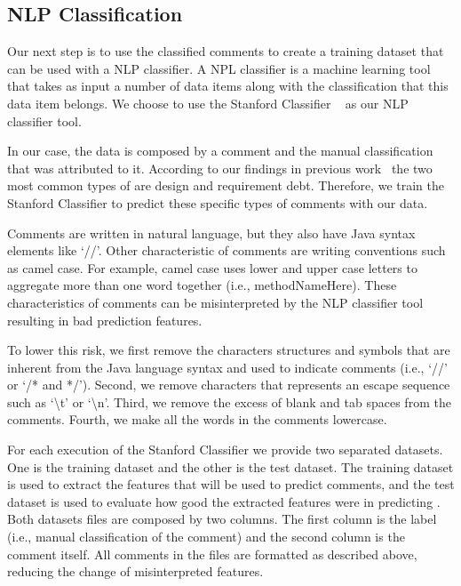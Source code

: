 
\subsection{NLP Classification} %
\label{sub:run_the_nlp_classifier}


Our next step is to use the classified \SATD comments to create a training dataset that can be used with a NLP classifier. A NPL classifier is a machine learning tool that takes as input a number of data items along with the classification that this data item belongs. We choose to use the Stanford Classifier ~\cite{Manning2014ACL} as our NLP classifier tool. 

In our case, the data is composed by a comment and the manual classification that was attributed to it. According to our findings in previous work~\cite{Maldonado2015MTD} the two most common types of \SATD are design and requirement debt. Therefore, we train the Stanford Classifier to predict these specific types of \SATD comments with our data.

Comments are written in natural language, but they also have Java syntax elements like `//'. Other characteristic of comments are writing conventions such as camel case. For example, camel case uses lower and upper case letters to aggregate more than one word together (i.e., methodNameHere). These characteristics of comments can be misinterpreted by the NLP classifier tool resulting in bad prediction features. 

To lower this risk, we first remove the characters structures and symbols that are inherent from the Java language syntax and used to indicate comments (i.e., `//' or `/* and */'). Second, we remove characters that represents an escape sequence such as `\textbackslash t' or `\textbackslash n'. Third, we remove the excess of blank and tab spaces from the comments. Fourth, we make all the words in the comments lowercase.

For each execution of the Stanford Classifier we provide two separated datasets. One is the training dataset and the other is the test dataset. The training dataset is used to extract the features that will be used to predict \SATD comments, and the test dataset is used to evaluate how good the extracted features were in predicting \SATD. Both datasets files are composed by two columns. The first column is the label (i.e., manual classification of the comment) and the second column is the comment itself. All comments in the files are formatted as described above, reducing the change of misinterpreted features. 

